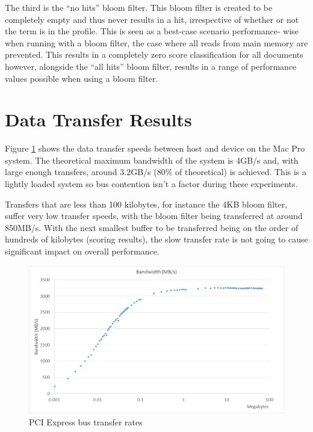 The third is the ``no hits'' bloom filter. This bloom filter is created to be
completely empty and thus never results in a hit, irrespective of whether or not
the term is in the profile. This is seen as a best-case scenario performance-
wise when running with a bloom filter, the case where all reads from main memory
are prevented. This results in a completely zero score classification for all
documents however, alongside the ``all hits'' bloom filter, results in a range
of performance values possible when using a bloom filter.

\section{Data Transfer Results}

Figure \ref{fig:dataTransfer} shows the data transfer speeds between host and
device on the Mac Pro system. The theoretical maximum bandwidth of the system is
4GB/s and, with large enough transfers, around 3.2GB/s (80\% of theoretical)
is achieved. This is a lightly loaded system so bus contention isn't a factor
during these experiments.

Transfers that are less than 100 kilobytes, for instance the 4KB bloom filter,
suffer very low transfer speeds, with the bloom filter being transferred at
around 850MB/s. With the next smallest buffer to be transferred being on the
order of hundreds of kilobytes (scoring results), the slow transfer rate is
not going to cause significant impact on overall performance.

\begin{figure}[H]
\centering
\includegraphics[width=\linewidth]{images/faraBandwidth.png}
\caption{PCI Express bus transfer rates}
\label{fig:dataTransfer}
\end{figure}

